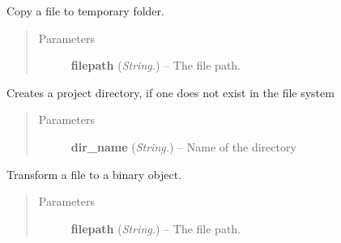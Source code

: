 \documentclass[letterpaper,10pt,english]{sphinxmanual}
\begin{document}

\begin{fulllineitems}
\label{api:filesystem.CopyToTemp}
Copy a file to temporary folder.
\begin{quote}\begin{description}
\item[{Parameters}] \leavevmode
\textbf{filepath} (\emph{String.}) -- The file path.

\end{description}\end{quote}

\end{fulllineitems}


\begin{fulllineitems}
\label{api:filesystem.CreateProjectDir}
Creates a project directory, if one does not exist in the file system
\begin{quote}\begin{description}
\item[{Parameters}] \leavevmode
\textbf{dir\_name} (\emph{String.}) -- Name of the directory

\end{description}\end{quote}

\end{fulllineitems}


\begin{fulllineitems}
\label{api:filesystem.FileToBase64}
Transform a file to a binary object.
\begin{quote}\begin{description}
\item[{Parameters}] \leavevmode
\textbf{filepath} (\emph{String.}) -- The file path.

\end{description}\end{quote}

\end{fulllineitems}

\end{document}
